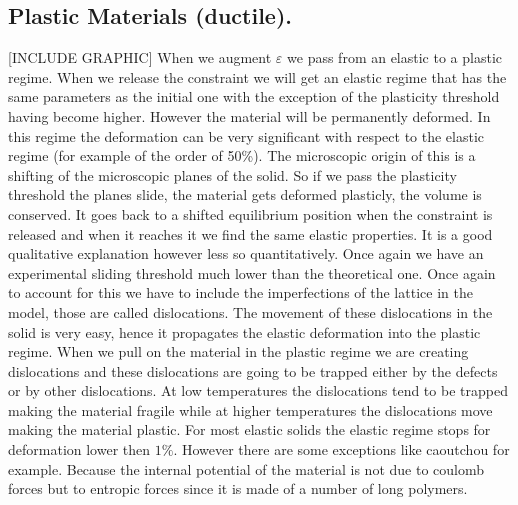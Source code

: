 \documentclass[10pt,a4paper]{book}
\begin{document}
\subsection{Plastic Materials (ductile).}
[INCLUDE GRAPHIC]
When we augment $\varepsilon$ we pass from an elastic to a plastic regime. When we release the constraint we will get an elastic regime that has the same parameters as the initial one with the exception of the plasticity threshold having become higher. However the material will be permanently deformed. In this regime the deformation can be very significant with respect to the elastic regime (for example of the order of 50\%). The microscopic origin of this is a shifting of the microscopic planes of the solid. So if we pass the plasticity threshold the planes slide, the material gets deformed plasticly, the volume is conserved. It goes back to a shifted equilibrium position when the constraint is released and when it reaches it we find the same elastic properties. It is a good qualitative explanation however less so quantitatively. Once again we have an experimental sliding threshold much lower than the theoretical one. Once again to account for this we have to include the imperfections of the lattice in the model, those are called dislocations. The movement of these dislocations in the solid is very easy, hence it propagates the elastic deformation into the plastic regime. When we pull on the material in the plastic regime we are creating dislocations and these dislocations are going to be trapped either by the defects or by other dislocations. At low temperatures the dislocations tend to be trapped making the material fragile while at higher temperatures the dislocations move making the material plastic. For most elastic solids the elastic regime stops for deformation lower then $1\%$. However there are some exceptions like caoutchou for example. Because the internal potential of the material is not due to coulomb forces but to entropic forces since it is made of a number of long polymers.
\end{document}
